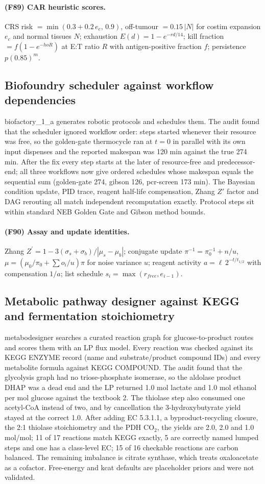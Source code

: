 \paragraph{(F89) CAR heuristic scores.} CRS risk $=\min(0.3+0.2\,e_c,\,0.9)$, off-tumour $=0.15\,|N|$ for costim expansion $e_c$ and normal tissues $N$; exhaustion $E(d)=1-e^{-r d/14}$; kill fraction $=f(1-e^{-
ho R})$ at E:T ratio $R$ with antigen-positive fraction $f$; persistence $p(0.85)^m$.
\subsection{Biofoundry scheduler against workflow dependencies}
biofactory\_1\_a generates robotic protocols and schedules them. The audit found that the scheduler ignored workflow order: steps started whenever their resource was free, so the golden-gate thermocycle ran at $t=0$ in parallel with its own input dispenses and the reported makespan was 120 min against the true 274 min. After the fix every step starts at the later of resource-free and predecessor-end; all three workflows now give ordered schedules whose makespan equals the sequential sum (golden-gate 274, gibson 126, pcr-screen 173 min). The Bayesian condition update, PID trace, reagent half-life compensation, Zhang $Z'$ factor and DAG rerouting all match independent recomputation exactly. Protocol steps sit within standard NEB Golden Gate and Gibson method bounds.
\paragraph{(F90) Assay and update identities.} Zhang $Z^\prime=1-3(\sigma_s+\sigma_b)/|\mu_s-\mu_b|$; conjugate update $\pi^{-1}=\pi_0^{-1}+n/
u$, $\mu=(\mu_0/\pi_0+\sum o_i/
u)\pi$ for noise variance $
u$; reagent activity $a=\ell\,2^{-t/t_{1/2}}$ with compensation $1/a$; list schedule $s_i=\max(r_{free},e_{i-1})$.
\subsection{Metabolic pathway designer against KEGG and fermentation stoichiometry}
metabodesigner searches a curated reaction graph for glucose-to-product routes and scores them with an LP flux model. Every reaction was checked against its KEGG ENZYME record (name and substrate/product compound IDs) and every metabolite formula against KEGG COMPOUND. The audit found that the glycolysis graph had no triose-phosphate isomerase, so the aldolase product DHAP was a dead end and the LP returned 1.0 mol lactate and 1.0 mol ethanol per mol glucose against the textbook 2. The thiolase step also consumed one acetyl-CoA instead of two, and by cancellation the 3-hydroxybutyrate yield stayed at the correct 1.0. After adding EC 5.3.1.1, a byproduct-recycling closure, the 2:1 thiolase stoichiometry and the PDH CO$_2$, the yields are 2.0, 2.0 and 1.0 mol/mol; 11 of 17 reactions match KEGG exactly, 5 are correctly named lumped steps and one has a class-level EC; 15 of 16 checkable reactions are carbon balanced. The remaining imbalance is citrate synthase, which treats oxaloacetate as a cofactor. Free-energy and kcat defaults are placeholder priors and were not validated.
